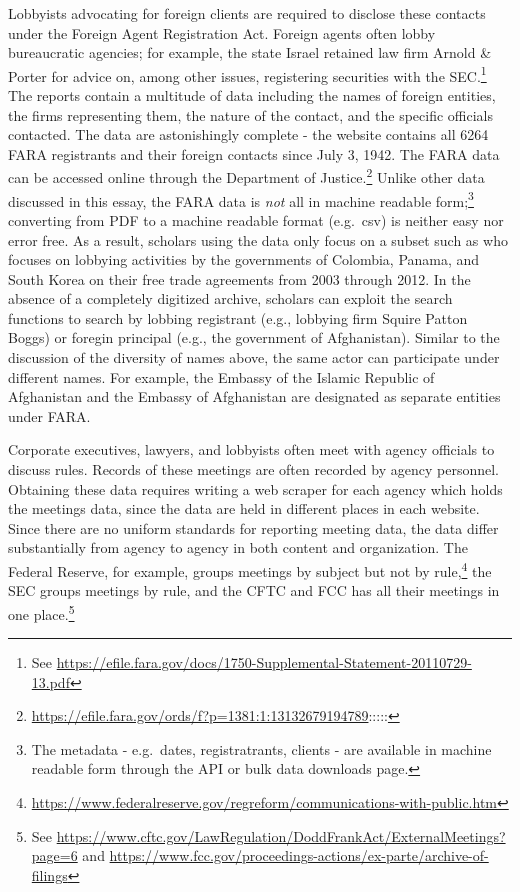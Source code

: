 \documentclass[12pt,notitlepage]{article}
\newcounter{cor}
\begin{document}
Lobbyists advocating for foreign clients are required to disclose these
contacts under the Foreign Agent Registration Act. Foreign agents often
lobby bureaucratic agencies; for example, the state Israel retained law
firm Arnold \& Porter for advice on, among other issues, registering
securities with the SEC.\footnote{See
  \url{https://efile.fara.gov/docs/1750-Supplemental-Statement-20110729-13.pdf}}
The reports contain a multitude of data including the names of foreign
entities, the firms representing them, the nature of the contact, and
the specific officials contacted. The data are astonishingly complete -
the website contains all 6264 FARA registrants and their foreign
contacts since July 3, 1942. The FARA data can be accessed online
through the Department of Justice.\footnote{\url{https://efile.fara.gov/ords/f?p=1381:1:13132679194789}:::::}
Unlike other data discussed in this essay, the FARA data is \emph{not}
all in machine readable form;\footnote{The metadata - e.g.~dates,
  registratrants, clients - are available in machine readable form
  through the API or bulk data downloads page.} converting from PDF to a
machine readable format (e.g.~csv) is neither easy nor error free. As a
result, scholars using the data only focus on a subset such as
\citet{You_2019} who focuses on lobbying activities by the governments
of Colombia, Panama, and South Korea on their free trade agreements from
2003 through 2012. In the absence of a completely digitized archive,
scholars can exploit the search functions to search by lobbing
registrant (e.g., lobbying firm Squire Patton Boggs) or foregin
principal (e.g., the government of Afghanistan). Similar to the
discussion of the diversity of names above, the same actor can
participate under different names. For example, the Embassy of the
Islamic Republic of Afghanistan and the Embassy of Afghanistan are
designated as separate entities under FARA.

Corporate executives, lawyers, and lobbyists often meet with agency
officials to discuss rules. Records of these meetings are often recorded
by agency personnel. Obtaining these data requires writing a web scraper
for each agency which holds the meetings data, since the data are held
in different places in each website. Since there are no uniform
standards for reporting meeting data, the data differ substantially from
agency to agency in both content and organization. The Federal Reserve,
for example, groups meetings by subject but not by rule,\footnote{\url{https://www.federalreserve.gov/regreform/communications-with-public.htm}}
the SEC groups meetings by rule, and the CFTC and FCC has all their
meetings in one place.\footnote{See
  \url{https://www.cftc.gov/LawRegulation/DoddFrankAct/ExternalMeetings?page=6}
  and
  \url{https://www.fcc.gov/proceedings-actions/ex-parte/archive-of-filings}}
\end{document}
